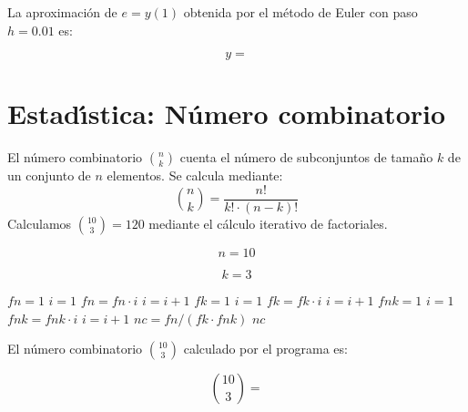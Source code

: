 \documentclass{article}
\begin{document}
La aproximaci\'on de $e = y(1)$ obtenida por el m\'etodo de Euler con paso $h = 0.01$ es:

\begin{equation}
    y =
    \label{eq:res:y}
\end{equation}


\section{Estad\'{\i}stica: N\'umero combinatorio}

El n\'umero combinatorio $\binom{n}{k}$ cuenta el n\'umero de subconjuntos de tama\~no
$k$ de un conjunto de $n$ elementos. Se calcula mediante:
\[
    \binom{n}{k} = \frac{n!}{k! \cdot (n-k)!}
\]
Calculamos $\binom{10}{3} = 120$ mediante el c\'alculo iterativo de factoriales.

\begin{equation}
    n = 10
    \label{eq:calc:n}
\end{equation}

\begin{equation}
    k = 3
    \label{eq:calc:k}
\end{equation}

\begin{algorithm}
\caption{C\'alculo de $\binom{n}{k}$ mediante factoriales iterativos}
\begin{algorithmic}
    \STATE $fn = 1$
    \STATE $i = 1$
        \STATE $fn = fn \cdot i$
        \STATE $i = i + 1$
    \ENDWHILE
    \STATE $fk = 1$
    \STATE $i = 1$
        \STATE $fk = fk \cdot i$
        \STATE $i = i + 1$
    \ENDWHILE
    \STATE $fnk = 1$
    \STATE $i = 1$
        \STATE $fnk = fnk \cdot i$
        \STATE $i = i + 1$
    \ENDWHILE
    \STATE $nc = fn / (fk \cdot fnk)$
    \RETURN $nc$
\end{algorithmic}
\end{algorithm}

El n\'umero combinatorio $\binom{10}{3}$ calculado por el programa es:

\begin{equation}
    \binom{10}{3} =
    \label{eq:res:nc}
\end{equation}

\end{document}
